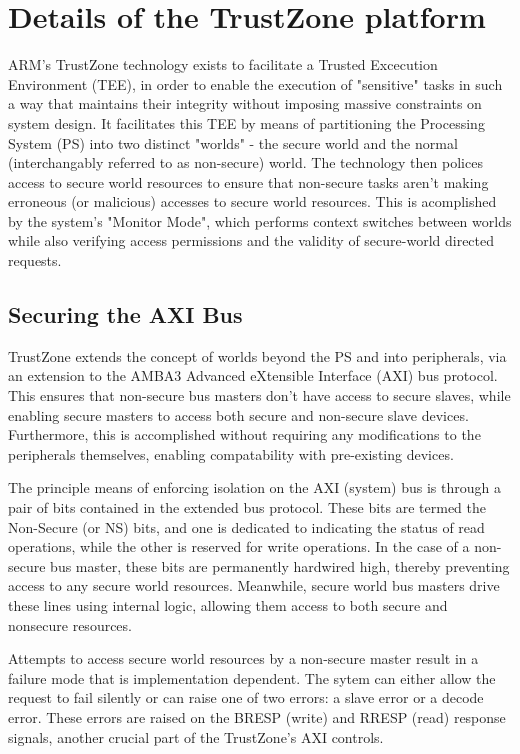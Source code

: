 \documentclass[journal]{IEEEtran}
\begin{document}
\section{Details of the TrustZone platform}
ARM's TrustZone technology exists to facilitate a Trusted Excecution Environment (TEE), in
order to enable the execution of "sensitive" tasks in such a way that maintains their
integrity without imposing massive constraints on system design. It facilitates this TEE
by means of partitioning the Processing System (PS) into two distinct "worlds" - the
secure world and the normal (interchangably referred to as non-secure) world. The
technology then polices access to secure world resources to ensure that non-secure tasks
aren't making erroneous (or malicious) accesses to secure world resources. This is
acomplished by the system's "Monitor Mode", which performs context switches between worlds
while also verifying access permissions and the validity of secure-world directed requests.

\subsection{Securing the AXI Bus}
TrustZone extends the concept of worlds beyond the PS and into peripherals,
via an extension to the AMBA3 Advanced eXtensible Interface (AXI) bus protocol. This
ensures that non-secure bus masters don't have access to secure slaves, while enabling
secure masters to access both secure and non-secure slave devices. Furthermore, this is
accomplished without requiring any modifications to the peripherals themselves, enabling
compatability with pre-existing devices.

The principle means of enforcing isolation on the AXI (system) bus is through a pair of
bits contained in the extended bus protocol. These bits are termed the Non-Secure (or NS)
bits, and one is dedicated to indicating the status of read operations, while the other is
reserved for write operations.\cite{benhani_security_2019} In the case of a non-secure bus
 master, these bits are permanently hardwired high, thereby preventing access to any 
 secure world resources. Meanwhile, secure world bus masters drive these lines using 
 internal logic, allowing them access to both secure and nonsecure resources.

Attempts to access secure world resources by a non-secure master result in a failure mode
that is implementation dependent. The sytem can either allow the request to fail silently
or can raise one of two errors: a slave error or a decode error. These errors are raised
on the BRESP (write) and RRESP (read) response signals, another crucial part of the 
TrustZone's AXI controls. \cite{benhani_security_2017}
\end{document}
